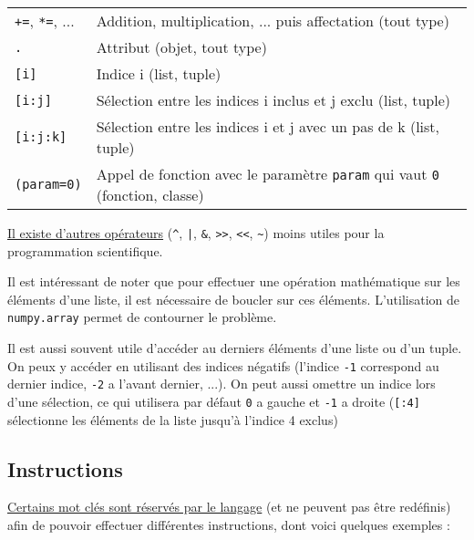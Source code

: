 \documentclass{article}
\begin{document}
\begin{tabular}{|l|l|}
    \texttt{+=}, \texttt{*=}, ...   & Addition, multiplication, ... puis affectation (tout type)\\
    \texttt{.}                      & Attribut (objet, tout type)\\
    \texttt{[i]}                    & Indice i (list, tuple)\\
    \texttt{[i:j]}                  & Sélection entre les indices i inclus et j exclu (list, tuple)\\
    \texttt{[i:j:k]}                & Sélection entre les indices i et j avec un pas de k (list, tuple)\\
    \texttt{(param=0)}              & Appel de fonction avec le paramètre \texttt{param} qui vaut \texttt{0} (fonction, classe)\\
    \hline
\end{tabular}

\href{https://fr.wikibooks.org/wiki/Programmation_Python/Tableau_des_op\%C3\%A9rateurs}{Il existe d'autres opérateurs} (\texttt{\^}, \texttt{|}, \texttt{\&}, \texttt{>>}, \texttt{<<}, \texttt{\~}) moins utiles pour la programmation scientifique.

Il est intéressant de noter que pour effectuer une opération mathématique sur les éléments d'une liste, il est nécessaire de boucler sur ces éléments. L'utilisation de \texttt{numpy.array} permet de contourner le problème.

Il est aussi souvent utile d'accéder au derniers éléments d'une liste ou d'un tuple. On peux y accéder en utilisant des indices négatifs (l'indice \texttt{-1} correspond au dernier indice, \texttt{-2} a l'avant dernier, ...). On peut aussi omettre un indice lors d'une sélection, ce qui utilisera par défaut \texttt{0} a gauche et \texttt{-1} a droite (\texttt{[:4]} sélectionne les éléments de la liste jusqu'à l'indice 4 exclus)
\subsection*{Instructions}
\href{https://fr.wikibooks.org/wiki/Programmation_Python/Tableau_des_mots_r\%C3\%A9serv\%C3\%A9s}{Certains mot clés sont réservés par le langage} (et ne peuvent pas être redéfinis) afin de pouvoir effectuer différentes instructions, dont voici quelques exemples :
\end{document}
